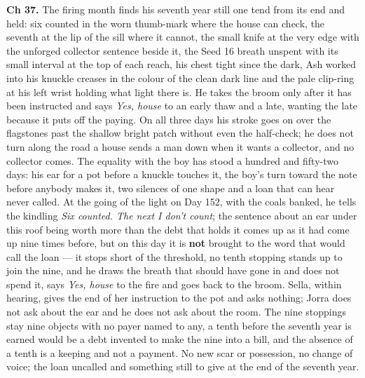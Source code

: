 \documentclass{design/chronicle}
\begin{document}
{\textbf{Ch 37.} The firing month finds his seventh year still one tend from its end and held: six counted in the worn thumb-mark where the house can check, the seventh at the lip of the sill where it cannot, the small knife at the very edge with the unforged collector sentence beside it, the Seed 16 breath unspent with its small interval at the top of each reach, his chest tight since the dark, Ash worked into his knuckle creases in the colour of the clean dark line and the pale clip-ring at his left wrist holding what light there is. He takes the broom only after it has been instructed and says \emph{Yes, house} to an early thaw and a late, wanting the late because it puts off the paying. On all three days his stroke goes on over the flagstones past the shallow bright patch without even the half-check; he does not turn along the road a house sends a man down when it wants a collector, and no collector comes. The equality with the boy has stood a hundred and fifty-two days: his ear for a pot before a knuckle touches it, the boy’s turn toward the note before anybody makes it, two silences of one shape and a loan that can hear never called. At the going of the light on Day 152, with the coals banked, he tells the kindling \emph{Six counted. The next I don’t count}; the sentence about an ear under this roof being worth more than the debt that holds it comes up as it had come up nine times before, but on this day it is \textbf{not} brought to the word that would call the loan --- it stops short of the threshold, no tenth stopping stands up to join the nine, and he draws the breath that should have gone in and does not spend it, says \emph{Yes, house} to the fire and goes back to the broom. Sella, within hearing, gives the end of her instruction to the pot and asks nothing; Jorra does not ask about the ear and he does not ask about the room. The nine stoppings stay nine objects with no payer named to any, a tenth before the seventh year is earned would be a debt invented to make the nine into a bill, and the absence of a tenth is a keeping and not a payment. No new scar or possession, no change of voice; the loan uncalled and something still to give at the end of the seventh year.

}
\end{document}
